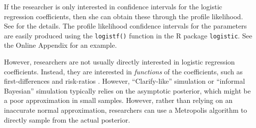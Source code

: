 \documentclass[12pt]{article}
\begin{document}
If the researcher is only interested in confidence intervals for the logistic regression coefficients, then she can obtain these through the profile likelihood. See \citet{McCullaghNelder1989} for the details. The profile likelihood confidence intervals for the parameters are easily produced using the \texttt{logistf()} function in the R package \texttt{logistic}. See the Online Appendix for an example.

However, researchers are not usually directly interested in logistic regression coefficients. Instead, they are interested in \emph{functions} of the coefficients, such as first-differences and risk-ratios \citep{King1989, KingTomzWittenberg2000}. However, ``Clarify-like'' simulation \citep{TomzWittenbergKing2003} or ``informal Bayesian'' simulation \citep{GelmanHill2006} typically relies on the asymptotic posterior, which might be a poor approximation in small samples. However, rather than relying on an inaccurate normal approximation, researchers can use a Metropolis algorithm to directly sample from the actual posterior.
\end{document}
